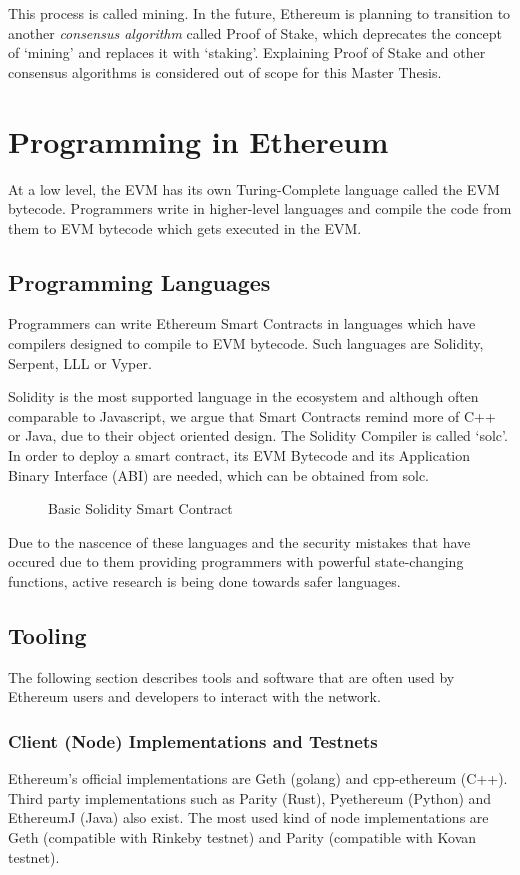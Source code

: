 This process is called mining. In the future, Ethereum is planning to transition to another \textit{consensus algorithm} called Proof of Stake, which deprecates the concept of `mining' and replaces it with `staking'. Explaining Proof of Stake and other consensus algorithms is considered out of scope for this Master Thesis.


\section{Programming in Ethereum}
At a low level, the EVM has its own Turing-Complete language called the EVM bytecode. Programmers write in higher-level languages and compile the code from them to EVM bytecode which gets executed in the EVM.

\subsection{Programming Languages}
Programmers can write Ethereum Smart Contracts in languages which have compilers designed to compile to EVM bytecode. Such languages are Solidity, Serpent, LLL or Vyper. 

Solidity is the most supported language in the ecosystem and although often comparable to Javascript, we argue that Smart Contracts remind more of C++ or Java, due to their object oriented design. The Solidity Compiler is called `solc'. In order to deploy a smart contract, its EVM Bytecode and its Application Binary Interface (ABI) are needed, which can be obtained from solc.

\begin{figure}[ht]
    \centering
    
    \caption{Basic Solidity Smart Contract}
    \label{fig:smart_contract}
\end{figure}

Due to the nascence of these languages and the security mistakes that have occured due to them providing programmers with powerful state-changing functions, active research is being done towards safer languages. 

\subsection{Tooling}
The following section describes tools and software that are often used by Ethereum users and developers to interact with the network.
\subsubsection{Client (Node) Implementations and Testnets}
Ethereum's official implementations are Geth (golang) and cpp-ethereum (C++). Third party implementations such as Parity (Rust), Pyethereum (Python) and EthereumJ (Java) also exist. The most used kind of node implementations are Geth (compatible with Rinkeby testnet) and Parity (compatible with Kovan testnet). 

